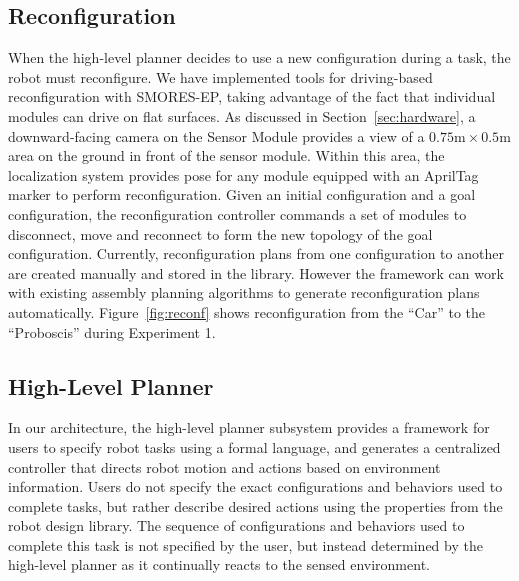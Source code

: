 \documentclass[12pt]{article}
\begin{document}

\subsection{Reconfiguration}
\label{sec:reconfiguration}
%
When the high-level planner decides to use a new configuration during a task, the robot must reconfigure.
We have implemented tools for driving-based reconfiguration with SMORES-EP, taking advantage of the fact that individual modules can drive on flat surfaces.
As discussed in Section~\ref{sec:hardware}, a downward-facing camera on the Sensor Module provides a view of a $0.75\text{m}\times0.5\text{m}$ area on the ground in front of the sensor module.  
Within this area, the localization system provides pose for any module equipped with an AprilTag marker to perform reconfiguration. 
Given an initial configuration and a goal configuration, the reconfiguration controller commands a set of modules to disconnect, move and reconnect to form the new topology of the goal configuration. 
Currently, reconfiguration plans from one configuration to another are created manually and stored in the library. However the framework can work with existing assembly planning algorithms \cite{Werfel2007,Seo2013} to generate reconfiguration plans automatically.
Figure~\ref{fig:reconf} shows reconfiguration from the ``Car'' to the ``Proboscis'' during Experiment 1.
%

\subsection{High-Level Planner}
\label{sec:high-level}

In our architecture, the high-level planner subsystem provides a framework for users to specify robot tasks using a formal language, and generates a centralized controller that directs robot motion and actions based on environment information.
Users do not specify the exact configurations and behaviors used to complete tasks, but rather describe desired actions using the properties from the robot design library.
The sequence of configurations and behaviors used to complete this task is not specified by the user, but instead determined by the high-level planner as it continually reacts to the sensed environment.
\end{document}
